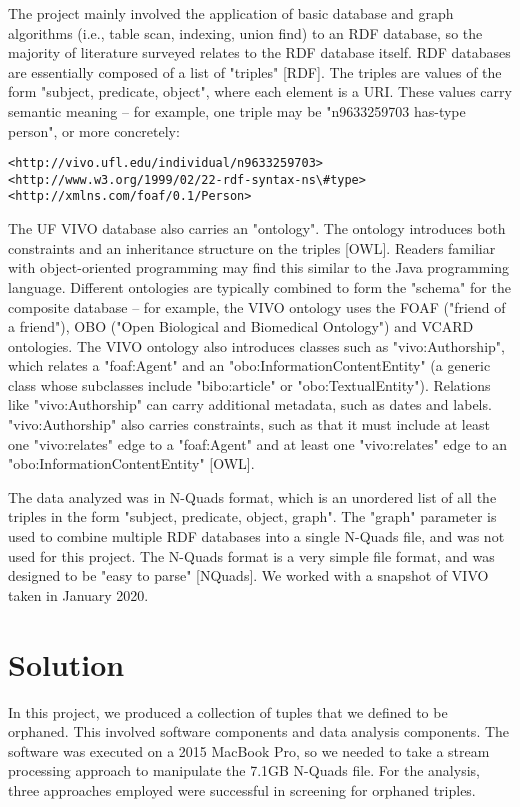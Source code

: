 \documentclass[11pt]{article}
\begin{document}
The project mainly involved the application of basic database and graph algorithms (i.e., table scan, indexing, union find) to an RDF database, so the majority of literature surveyed relates to the RDF database itself. RDF databases are essentially composed of a list of "triples" [RDF]. The triples are values of the form "subject, predicate, object", where each element is a URI. These values carry semantic meaning -- for example, one triple may be "n9633259703 has-type person", or more concretely:

\begin{lstlisting}
<http://vivo.ufl.edu/individual/n9633259703> <http://www.w3.org/1999/02/22-rdf-syntax-ns\#type> <http://xmlns.com/foaf/0.1/Person>
\end{lstlisting}

The UF VIVO database also carries an "ontology". The ontology introduces both constraints and an inheritance structure on the triples [OWL]. Readers familiar with object-oriented programming may find this similar to the Java programming language. Different ontologies are typically combined to form the "schema" for the composite database -- for example, the VIVO ontology uses the FOAF ("friend of a friend"), OBO ("Open Biological and Biomedical Ontology") and VCARD ontologies. The VIVO ontology also introduces classes such as "vivo:Authorship", which relates a "foaf:Agent" and an "obo:InformationContentEntity" (a generic class whose subclasses include "bibo:article" or "obo:TextualEntity"). Relations like "vivo:Authorship" can carry additional metadata, such as dates and labels. "vivo:Authorship" also carries constraints, such as that it must include at least one "vivo:relates" edge to a "foaf:Agent" and at least one "vivo:relates" edge to an "obo:InformationContentEntity" [OWL].

The data analyzed was in N-Quads format, which is an unordered list of all the triples in the form "subject, predicate, object, graph". The "graph" parameter is used to combine multiple RDF databases into a single N-Quads file, and was not used for this project. The N-Quads format is a very simple file format, and was designed to be "easy to parse" [NQuads]. We worked with a snapshot of VIVO taken in January 2020.

\section*{Solution}
In this project, we produced a collection of tuples that we defined to be orphaned. This involved software components and data analysis components. The software was executed on a 2015 MacBook Pro, so we needed to take a stream processing approach to manipulate the 7.1GB N-Quads file. For the analysis, three approaches employed were successful in screening for orphaned triples.
\end{document}
